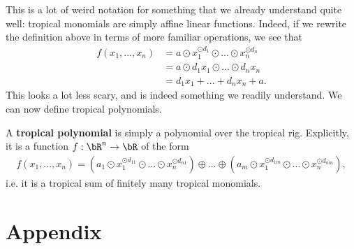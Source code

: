 This is a lot of weird notation for something that we already understand quite well: tropical monomials are simply affine linear functions. Indeed, if we rewrite the definition above in terms of more familiar operations, we see that
\begin{align*}
	f(x_1,...,x_n) 
	&= a\odot x_1^{\odot d_1}\odot...\odot x_n^{\odot d_n} \\
	&= a\odot d_1x_1\odot ... \odot d_n x_n \\
	&= d_1x_1 + ... + d_nx_n + a.
\end{align*}
This looks a lot less scary, and is indeed something we readily understand. We can now define tropical polynomials.
\begin{defn}\label{defn:tropical-polynomial}
	A \textbf{tropical polynomial} is simply a polynomial over the tropical rig. Explicitly, it is a function $f:\bR^n \to \bR$ of the form
	\begin{align*}
		f(x_1,...,x_n) = (a_1\odot x_1^{\odot d_{11}}\odot...\odot x_n^{\odot d_{n1}} ) \oplus...\oplus (a_m\odot x_1^{\odot d_{1m}}\odot...\odot x_n^{\odot d_{nm}} ),
	\end{align*}
	i.e. it is a tropical sum of finitely many tropical monomials.
\end{defn}
\section{Appendix}

\printbibliography

